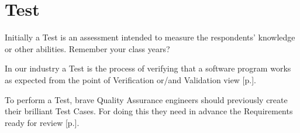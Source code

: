 \section{Test}
\label{sec:Test}

Initially a Test is an assessment intended to measure the respondents' knowledge or other abilities. Remember your class years?

In our industry a Test is the process of verifying that a software program works as expected from the point of Verification or/and Validation view [p.\pageref{sec:Verification}].

To perform a Test, brave Quality Assurance engineers should previously create their brilliant Test Cases. For doing this they need in advance the Requirements ready for review [p.\pageref{sec:Requirement}].
